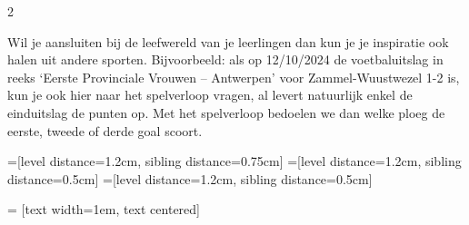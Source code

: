 \begin{multicols}{2}
\begin{afbeeldingenv}
\caption{Telboom volleybalmatch met 3 te winnen sets}
\label{fig:volleybal_max5sets}
\end{afbeeldingenv}

Wil je aansluiten bij de leefwereld van je leerlingen dan kun je je inspiratie ook halen uit andere sporten. Bijvoorbeeld: als op 12/10/2024 de voetbaluitslag in reeks ‘Eerste Provinciale Vrouwen – Antwerpen’ voor Zammel-Wuustwezel  1-2 is, kun je ook hier naar het spelverloop vragen, al levert natuurlijk enkel de einduitslag de punten op. Met het spelverloop bedoelen we dan welke ploeg de eerste, tweede of derde goal scoort.

\begin{afbeeldingenv}
=[level distance=1.2cm, sibling distance=0.75cm]
=[level distance=1.2cm, sibling distance=0.5cm]
=[level distance=1.2cm, sibling distance=0.5cm]

 = [text width=1em, text centered]


\end{afbeeldingenv}
\end{multicols}
